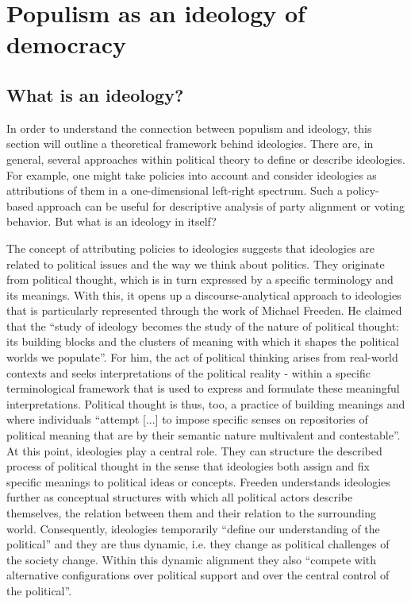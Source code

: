 \documentclass[a4paper]{scrreprt}
\begin{document}
\chapter{Populism as an ideology of democracy}
\section{What is an ideology?}
In order to understand the connection between populism and ideology, this section will outline a theoretical framework behind ideologies. There are, in general, several approaches within political theory to define or describe ideologies. For example, one might take policies into account and consider ideologies as attributions of them in a one-dimensional left-right spectrum. Such a policy-based approach can be useful for descriptive analysis of party alignment or voting behavior. \citep[p.~154]{lembcke:2014} But what is an ideology in itself?\par
The concept of attributing policies to ideologies suggests that ideologies are related to political issues and the way we think about politics. They originate from political thought, which is in turn expressed by a specific terminology and its meanings. With this, it opens up a discourse-analytical approach to ideologies that is particularly represented through the work of Michael Freeden. He claimed that the ``study of ideology becomes the study of the nature of political thought: its building blocks and the clusters of meaning with which it shapes the political worlds we populate''. \cite[p.~15]{freeden:2006} For him, the act of political thinking arises from real-world contexts and seeks interpretations of the political reality - within a specific terminological framework that is used to express and formulate these meaningful interpretations. Political thought is thus, too, a practice of building meanings and where individuals ``attempt [...] to impose specific senses on repositories of political meaning that are by their semantic nature multivalent and contestable''. \cite[p.~19]{freeden:2006} At this point, ideologies play a central role. They can structure the described process of political thought in the sense that ideologies both assign and fix specific meanings to political ideas or concepts. Freeden understands ideologies further as conceptual structures with which all political actors describe themselves, the relation between them and their relation to the surrounding world. Consequently, ideologies temporarily ``define our understanding of the political'' and they are thus dynamic, i.e. they change as political challenges of the society change. Within this dynamic alignment they also ``compete with alternative configurations over political support and over the central control of the political''. \cite[p.~14]{freeden:2006}\par
\end{document}
